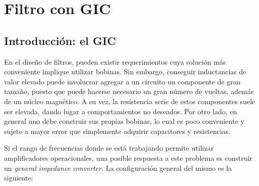 \documentclass[../../tc_tp3_main.tex]{subfiles}
\begin{document}
\chapter{Filtro con GIC}

\section{Introducci\'on: el GIC}
\label{section:1-intro}

En el dise\~no de filtros, pueden existir requerimientos cuya soluci\'on m\'as conveniente implique utilizar bobinas. Sin embargo, conseguir inductancias de valor elevado puede involucrar agregar a un circuito un componente de gran tama\~no, puesto que puede hacerse necesario un gran n\'umero de vueltas, adem\'as de un n\'ucleo magn\'etico. A su vez, la resistencia serie de estos componentes suele ser elevada, dando lugar a comportamientos no deseados. Por otro lado, en general uno debe construir sus propias bobinas, lo cual es poco conveniente y sujeto a mayor error que simplemente adquirir capacitores y resistencias. \par 

Si el rango de frecuencias donde se est\'a trabajando permite utilizar amplificadores operacionales, una posible respuesta a este problema es construir un \textit{general impedance converter}. La configuraci\'on general del mismo es la siguiente:
\end{document}
